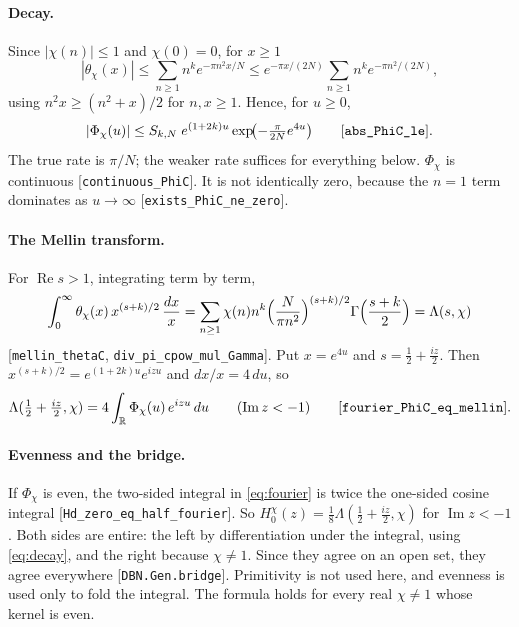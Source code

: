 \documentclass[11pt]{article}
\theoremstyle{definition}
\newcommand{\lean}[1]{\texttt{#1}}
\newcommand{\re}{\operatorname{Re}}
\newcommand{\im}{\operatorname{Im}}
\newcommand{\R}{\mathbb{R}}
\newcommand{\Lc}{\Lambda}
\begin{document}
\paragraph{Decay.} Since $|\chi(n)| \le 1$ and $\chi(0) = 0$, for $x \ge 1$
\[
|\theta_\chi(x)| \le \sum_{n\ge1}n^k e^{-\pi n^2x/N} \le e^{-\pi x/(2N)}\sum_{n\ge1}n^ke^{-\pi n^2/(2N)},
\]
using $n^2x \ge (n^2+x)/2$ for $n, x \ge 1$. Hence, for $u \ge 0$,
\begin{equation}\label{eq:decay}
|\Phi_\chi(u)| \le S_{k,N}\; e^{(1+2k)u}\exp\!\bigl(-\tfrac{\pi}{2N}e^{4u}\bigr)
\qquad\text{[\lean{abs\_\allowbreak{}PhiC\_\allowbreak{}le}]}.
\end{equation}
The true rate is $\pi/N$; the weaker rate suffices for everything below. $\Phi_\chi$ is continuous [\lean{continuous\_\allowbreak{}PhiC}]. It is not identically zero, because the $n = 1$ term dominates as $u \to \infty$ [\lean{exists\_\allowbreak{}PhiC\_\allowbreak{}ne\_\allowbreak{}zero}].

\paragraph{The Mellin transform.} For $\re s > 1$, integrating term by term,
\[
\int_0^\infty \theta_\chi(x)\,x^{(s+k)/2}\,\frac{dx}{x}
= \sum_{n\ge1}\chi(n)n^k\Bigl(\frac{N}{\pi n^2}\Bigr)^{(s+k)/2}\Gamma\Bigl(\frac{s+k}2\Bigr)
= \Lc(s,\chi)
\]
[\lean{mellin\_\allowbreak{}thetaC}, \lean{div\_\allowbreak{}pi\_\allowbreak{}cpow\_\allowbreak{}mul\_\allowbreak{}Gamma}].
Put $x = e^{4u}$ and $s = \tfrac12 + \tfrac{iz}2$. Then $x^{(s+k)/2} = e^{(1+2k)u}e^{izu}$ and $dx/x = 4\,du$, so
\begin{equation}\label{eq:fourier}
\Lc(\tfrac12 + \tfrac{iz}2,\chi) = 4\int_\R \Phi_\chi(u)\,e^{izu}\,du\qquad(\im z < -1)\qquad\text{[\lean{fourier\_\allowbreak{}PhiC\_\allowbreak{}eq\_\allowbreak{}mellin}]}.
\end{equation}

\paragraph{Evenness and the bridge.} If $\Phi_\chi$ is even, the two-sided integral in \eqref{eq:fourier} is twice the one-sided cosine integral [\lean{Hd\_\allowbreak{}zero\_\allowbreak{}eq\_\allowbreak{}half\_\allowbreak{}fourier}]. So $H^\chi_0(z) = \tfrac18\Lc(\tfrac12 + \tfrac{iz}{2},\chi)$ for $\im z < -1$. Both sides are entire: the left by differentiation under the integral, using \eqref{eq:decay}, and the right because $\chi \ne 1$. Since they agree on an open set, they agree everywhere [\lean{DBN.Gen.bridge}]. Primitivity is not used here, and evenness is used only to fold the integral. The formula holds for every real $\chi \ne 1$ whose kernel is even.
\end{document}
